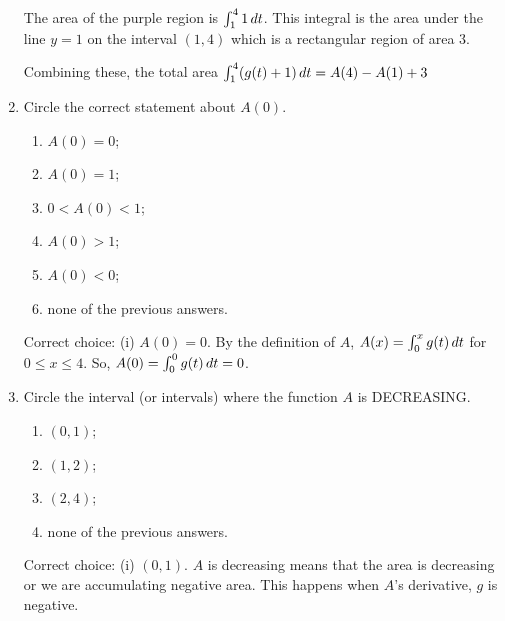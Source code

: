 \documentclass[nooutcomes,handout]{ximera}
\begin{document}
\begin{problem}
\begin{enumerate}
\begin{freeResponse}
            The area of the purple region is $\int_1^4  1 \,d t$.  This integral is the area under the line $y=1$ on the interval $(1,4)$ which is a rectangular region of area $3$.
            
             Combining these, the total area  $\int_1^4 (g(t) + 1) \,d t = A(4)-A(1)+3$
            
            
            
      \end{freeResponse}

    \item
      Circle the correct statement about $A(0)$.
      \begin{enumerate}
        \item $A(0) = 0$;
        \item $A(0) = 1$;
        \item $0 < A(0) < 1$;
        \item $A(0) > 1$;
        \item $A(0) < 0$;
        \item none of the previous answers.
      \end{enumerate}
      \begin{freeResponse}
        Correct choice: (i) $A(0) = 0$.  By the definition of $A$, $A(x)=\int_0^x g(t) \,d t$ for $0 \le x \le 4$. So, $A(0)=\int_0^0 g(t) \,d t=0$.  
      \end{freeResponse}

    \item
      Circle the interval (or intervals) where the function $A$ is DECREASING.
      \begin{enumerate}
        \item $(0, 1)$;
        \item $(1, 2)$;
        \item $(2, 4)$;
        \item none of the previous answers.
      \end{enumerate}
      \begin{freeResponse}
        Correct choice: (i) $(0, 1)$.  $A$ is decreasing means that the area is decreasing or we are accumulating negative area.  This happens when $A$'s derivative, $g$ is negative.
      \end{freeResponse}


\end{enumerate}
\end{problem}
\end{document}
